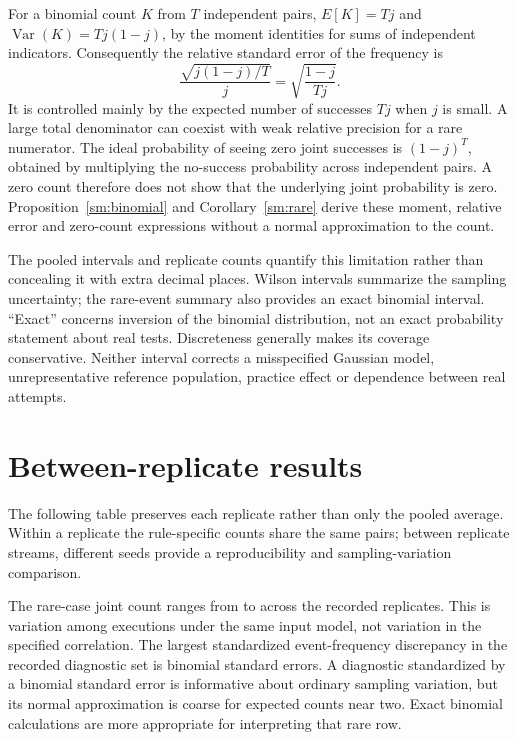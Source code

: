 For a binomial count \(K\) from \(T\) independent pairs,
\(E[K]=Tj\) and \(\operatorname{Var}(K)=Tj(1-j)\), by the moment
identities for sums of independent indicators. Consequently the relative
standard error of the frequency is
\[
 \frac{\sqrt{j(1-j)/T}}{j}
 =\sqrt{\frac{1-j}{Tj}}.
\]
It is controlled mainly by the expected number of successes \(Tj\) when
\(j\) is small. A large total denominator can coexist with weak relative
precision for a rare numerator. The ideal probability of seeing zero joint
successes is \((1-j)^T\), obtained by multiplying the no-success probability
across independent pairs. A zero count therefore does not show that the
underlying joint probability is zero.
Proposition~\ref{sm:binomial} and Corollary~\ref{sm:rare} derive these moment, relative
error and zero-count expressions without a normal approximation to the count.

The pooled intervals and replicate counts quantify this limitation rather
than concealing it with extra decimal places. Wilson intervals summarize the
sampling uncertainty; the rare-event summary also provides an exact binomial
interval. ``Exact'' concerns inversion of the binomial distribution, not an
exact probability statement about real tests. Discreteness generally makes
its coverage conservative. Neither interval corrects a misspecified Gaussian
model, unrepresentative reference population, practice effect or dependence
between real attempts.

\section{Between-replicate results}

The following table preserves each replicate rather than only the pooled
average. Within a replicate the rule-specific counts share the same pairs;
between replicate streams, different seeds provide a reproducibility and
sampling-variation comparison.


The rare-case joint count ranges from \SimRareMin{} to \SimRareMax{}
across the recorded replicates. This is variation among executions under the
same input model, not variation in the specified correlation. The largest
standardized event-frequency discrepancy in the recorded diagnostic set is
\SimMaxEventSE{} binomial standard errors. A diagnostic standardized by a
binomial standard error is informative about ordinary sampling variation,
but its normal approximation is coarse for expected counts near two. Exact
binomial calculations are more appropriate for interpreting that rare row.

